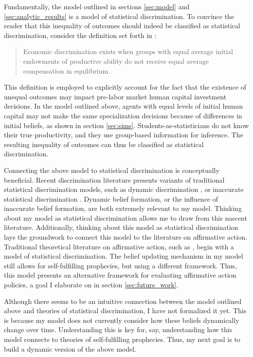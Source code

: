 Fundamentally, the model outlined in sections \ref{sec:model} and \ref{sec:analytic_results} is a model of statistical discrimination. 
To convince the reader that this inequality of outcomes should indeed be classified as statistical discrimination, consider the definition set forth in \textcite{LS83}:
\begin{quote}
Economic discrimination exists when groups with equal average initial endowments of productive ability do not receive equal average compensation in equilibrium.
\end{quote}
This definition is employed to explicitly account for the fact that the existence of unequal outcomes may impact pre-labor market human capital investment decisions. 
In the model outlined above, agents with equal levels of initial human capital may not make the same specialization decisions because of differences in initial beliefs, as shown in section \ref{sec:sims}.
Students-as-statisticians do not know their true productivity, and they use group-based information for inference. 
The resulting inequality of outcomes can thus be classified as statistical discrimination. 

Connecting the above model to statistical discrimination is conceptually beneficial.
Recent discrimination literature presents variants of traditional statistical discrimination models, such as dynamic discrimination \parencite{BIR19}, or inaccurate statistical discrimination \parencite{BHIP19-wp}. 
Dynamic belief formation, or the influence of inaccurate belief formation, are both extremely relevant to my model.
Thinking about my model as statistical discrimination allows me to draw from this nascent literature. 
Additionally, thinking about this model as statistical discrimination lays the groundwork to connect this model to the literature on affirmative action. 
Traditional theoretical literature on affirmative action, such as \textcite{CL93}, begin with a model of statistical discrimination.
The belief updating mechanism in my model still allows for self-fulfilling prophecies, but using a different framework.
Thus, this model presents an alternative framework for evaluating affirmative action policies, a goal I elaborate on in section \ref{sec:future_work}.



Although there seems to be an intuitive connection between the model outlined 
above and theories of statistical discrimination, I have not formalized it yet.
This is because my model does not currently consider how these beliefs dynamically change over time. 
Understanding this is key for, say, understanding how this model connects to theories of self-fulfilling prophecies.
Thus, my next goal is to build a dynamic version of the above model.
